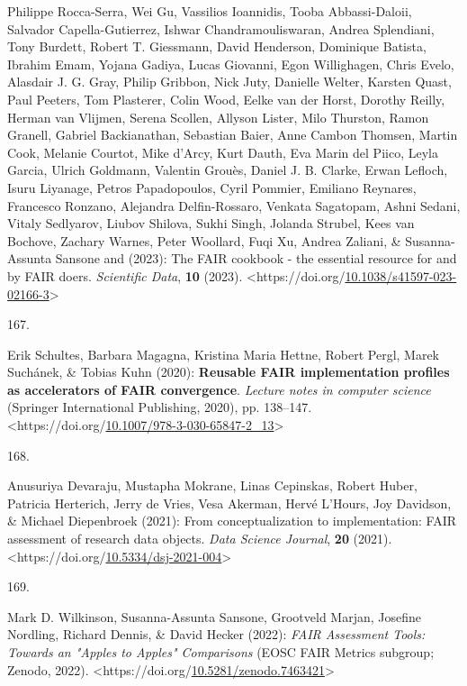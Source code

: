 \begin{thebibliography}{9}
Philippe Rocca-Serra, Wei Gu, Vassilios Ioannidis, Tooba Abbassi-Daloii,
Salvador Capella-Gutierrez, Ishwar Chandramouliswaran, Andrea
Splendiani, Tony Burdett, Robert T. Giessmann, David Henderson,
Dominique Batista, Ibrahim Emam, Yojana Gadiya, Lucas Giovanni, Egon
Willighagen, Chris Evelo, Alasdair J. G. Gray, Philip Gribbon, Nick
Juty, Danielle Welter, Karsten Quast, Paul Peeters, Tom Plasterer, Colin
Wood, Eelke van der Horst, Dorothy Reilly, Herman van Vlijmen, Serena
Scollen, Allyson Lister, Milo Thurston, Ramon Granell, Gabriel
Backianathan, Sebastian Baier, Anne Cambon Thomsen, Martin Cook, Melanie
Courtot, Mike d'Arcy, Kurt Dauth, Eva Marin del Piico, Leyla Garcia,
Ulrich Goldmann, Valentin Grouès, Daniel J. B. Clarke, Erwan Lefloch,
Isuru Liyanage, Petros Papadopoulos, Cyril Pommier, Emiliano Reynares,
Francesco Ronzano, Alejandra Delfin-Rossaro, Venkata Sagatopam, Ashni
Sedani, Vitaly Sedlyarov, Liubov Shilova, Sukhi Singh, Jolanda Strubel,
Kees van Bochove, Zachary Warnes, Peter Woollard, Fuqi Xu, Andrea
Zaliani, \& Susanna-Assunta Sansone and (2023): The {FAIR} cookbook -
the essential resource for and by {FAIR} doers. \emph{Scientific Data},
\textbf{10} (2023).
\textless https://doi.org/\href{https://doi.org/10.1038/s41597-023-02166-3}{10.1038/s41597-023-02166-3}\textgreater{}

\hypertarget{ref-FIP}{}
167.

Erik Schultes, Barbara Magagna, Kristina Maria Hettne, Robert Pergl,
Marek Suchánek, \& Tobias Kuhn (2020): \textbf{Reusable {FAIR}
implementation profiles as accelerators of {FAIR} convergence}.
\emph{Lecture notes in computer science} (Springer International
Publishing, 2020), pp. 138--147.
\textless https://doi.org/\href{https://doi.org/10.1007/978-3-030-65847-2_13}{10.1007/978-3-030-65847-2\_13}\textgreater{}

\hypertarget{ref-Devaraju_2021}{}
168.

Anusuriya Devaraju, Mustapha Mokrane, Linas Cepinskas, Robert Huber,
Patricia Herterich, Jerry de Vries, Vesa Akerman, Hervé L'Hours, Joy
Davidson, \& Michael Diepenbroek (2021): From conceptualization to
implementation: {FAIR} assessment of research data objects. \emph{Data
Science Journal}, \textbf{20} (2021).
\textless https://doi.org/\href{https://doi.org/10.5334/dsj-2021-004}{10.5334/dsj-2021-004}\textgreater{}

\hypertarget{ref-10.5281ux2fzenodo.7463421}{}
169.

Mark D. Wilkinson, Susanna-Assunta Sansone, Grootveld Marjan, Josefine
Nordling, Richard Dennis, \& David Hecker (2022): \emph{{FAIR Assessment
Tools: Towards an "Apples to Apples" Comparisons}} ({EOSC} {FAIR}
Metrics subgroup; Zenodo, 2022).
\textless https://doi.org/\href{https://doi.org/10.5281/zenodo.7463421}{10.5281/zenodo.7463421}\textgreater{}


\end{thebibliography}
